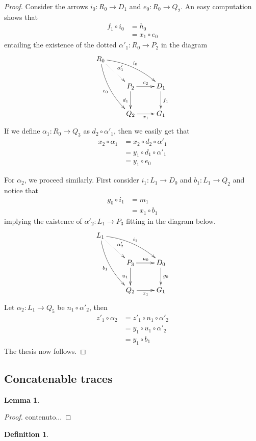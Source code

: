 \documentclass[a4paper]{article}
\newtheorem{lemma}[theorem]{Lemma}
\theoremstyle{definition}
\newtheorem{definition}[theorem]{Definition}
\begin{document}
\begin{proof}
	Consider the arrows $i_0\colon R_0\to D_1$ and $e_0\colon R_0\to Q_2$. An easy computation shows that
	\begin{align*}
		f_1\circ i_0&= h_0\\&=x_1\circ e_0
	\end{align*}
	entailing the existence of  the dotted $\alpha'_1\colon R_0\to P_2$ in the diagram
	\[\xymatrix{R_0 \ar@{.>}[dr]^{\alpha'_1} \ar@/^.3cm/[drr]^{i_0} \ar@/_.3cm/[ddr]_{e_0}\\ &P_2 \ar[r]^{c_2} \ar[d]_{d_1}& D_1 \ar[d]^{f_1}\\ &Q_2\ar[r]_{x_1} & G_1}\]
	If we define $\alpha_1\colon R_0\to Q_3$ as $d_2\circ \alpha'_1$, then we easily get that 
	\begin{align*}
		x_2\circ \alpha_1&=x_2\circ d_2\circ \alpha'_1\\&= y_1\circ d_1\circ \alpha'_1\\&=y_1\circ e_0
	\end{align*}
	
	For $\alpha_2$, we proceed similarly. First consider  $i_1\colon L_1\to D_0$ and $b_1\colon L_1 \to Q_2$ and notice that
	\begin{align*}
		g_0\circ i_1&= m_1 \\&= x_1 \circ b_1
	\end{align*}
	implying the existence of $\alpha'_2\colon L_1\to P_3$ fitting in the diagram below.
	\[\xymatrix{L_1 \ar@{.>}[dr]^{\alpha'_2} \ar@/^.3cm/[drr]^{i_1} \ar@/_.3cm/[ddr]_{b_1}\\ &P_3 \ar[r]^{u_0} \ar[d]_{u_1}& D_0 \ar[d]^{g_0}\\ &Q_2\ar[r]_{x_1} & G_1}\] 
	Let $\alpha_2\colon L_1\to Q_5$ be $n_1\circ \alpha'_2$, then
	\begin{align*}
		z'_1 \circ \alpha_2 & = z'_1 \circ n_1\circ \alpha'_2\\&=y_1\circ u_1\circ \alpha'_2\\&=y_1\circ b_1
	\end{align*}
	The thesis now follows.  
\end{proof}
\fi 


\subsection{Concatenable traces}
\begin{lemma}
\end{lemma}
\begin{proof}
	contenuto...
\end{proof}
\begin{definition}
\end{definition}
\end{document}
